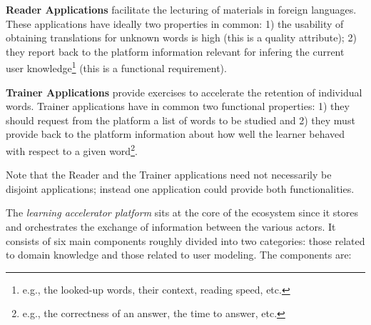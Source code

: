 \begin{description}
	
	\item {\bf Reader Applications} facilitate the lecturing of materials in foreign languages. These applications have ideally two properties in common: 
		1) the usability of obtaining translations for unknown words 
		is high (this is a quality attribute); 
		2) they report back to the platform information relevant for infering the current user knowledge\footnote{e.g., the looked-up words, their context, reading speed, etc.} (this is a functional requirement).

	\item {\bf Trainer Applications} provide exercises to accelerate the retention of individual words. Trainer applications have in common two functional properties: 
		1) they should request from the platform a list of words to be studied and 
		2) they must provide back to the platform information about how well the learner behaved with respect to a given word\footnote{e.g., the correctness of an answer, the time to answer, etc.}.

\end{description}

Note that the Reader and the Trainer applications need not necessarily be disjoint applications; instead one application could provide both functionalities.


The {\em learning accelerator platform} sits at the core of the ecosystem since it stores and orchestrates the exchange of information between the various actors. It consists of six main components roughly divided into two categories: those related to domain knowledge and those related to user modeling.
The components are:


